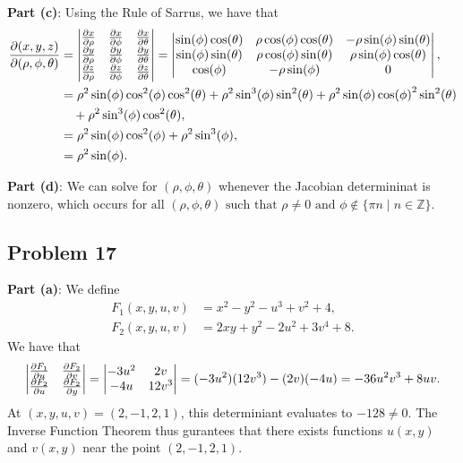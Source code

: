 \documentclass[11pt]{article}
\begin{document}
\textbf{Part (c)}: Using the Rule of Sarrus, we have that
\begin{align*}
	\pdv{(x, y, z)}{(\rho, \phi, \theta)} &= \begin{vmatrix} \pdv{x}{\rho} & \pdv{x}{\phi} & \pdv{x}{\theta} \\ \pdv{y}{\rho} & \pdv{y}{\phi} & \pdv{y}{\theta} \\ \pdv{z}{\rho} & \pdv{z}{\phi} & \pdv{z}{\theta} \end{vmatrix} = \begin{vmatrix} \sin(\phi)\cos(\theta) & \rho \cos(\phi) \cos(\theta) & -\rho \sin(\phi) \sin(\theta) \\ \sin(\phi) \sin(\theta) & \rho \cos(\phi) \sin(\theta) & \rho \sin(\phi) \cos(\theta) \\ \cos(\phi) & -\rho \sin(\phi) & 0 \end{vmatrix}, \\
	&= \rho^{2} \sin(\phi) \cos^{2}(\phi) \cos^{2}(\theta) + \rho^{2} \sin^{3}(\phi) \sin^{2}(\theta) + \rho^{2} \sin(\phi) \cos(\phi)^{2} \sin^{2}(\theta) \\ 
	& \quad + \rho^{2} \sin^{3}(\phi) \cos^{2}(\theta), \\
	&= \rho^{2} \sin(\phi) \cos^{2}(\phi) + \rho^{2} \sin^{3}(\phi), \\
	&= \rho^{2} \sin(\phi).
\end{align*}

\textbf{Part (d)}: We can solve for $(\rho, \phi, \theta)$ whenever the Jacobian determininat is nonzero, which occurs for $\boxed{\text{all $(\rho, \phi, \theta)$ such that $\rho \ne 0$ and $\phi \notin \{ \pi n \mid n \in \mathbb{Z} \}$}}$.


\subsection*{Problem 17}

\textbf{Part (a)}: We define
\begin{align*}
	F_{1}(x, y, u, v) &= x^{2} - y^{2} - u^{3} + v^{2} + 4, \\
	F_{2}(x, y, u, v) &= 2xy + y^{2} - 2u^{2} + 3v^{4} + 8.
\end{align*}
We have that
\[
	\begin{vmatrix} \pdv{F_{1}}{u} & \pdv{F_{2}}{v} \\ \pdv{F_{2}}{u} & \pdv{F_{2}}{y} \end{vmatrix} = \begin{vmatrix} -3 u^{2} & 2v \\ -4u & 12v^{3} \end{vmatrix} = (-3u^{2})(12v^{3}) - (2v)(-4u) = -36 u^{2} v^{3} + 8 uv.
\]
At $(x, y, u, v) = (2, -1, 2, 1)$, this determiniant evaluates to $-128 \ne 0$. The Inverse Function Theorem thus gurantees that there exists functions $u(x, y)$ and $v(x, y)$ near the point $(2, -1, 2, 1)$.
\end{document}
